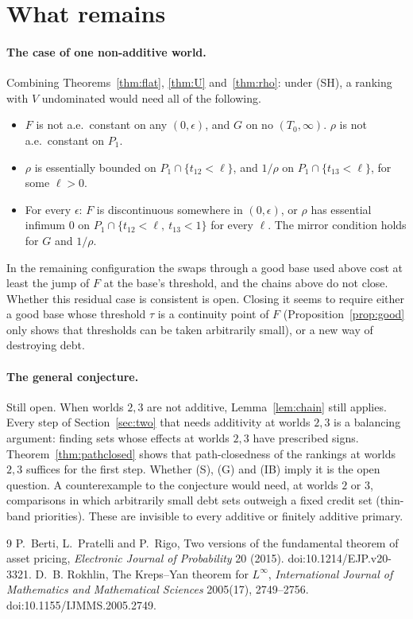 \documentclass[11pt]{article}
\theoremstyle{definition}\newtheorem{definition}[theorem]{Definition}
\theoremstyle{remark}\newtheorem{remark}[theorem]{Remark}
\begin{document}
\section{What remains}\label{sec:open}

\paragraph{The case of one non-additive world.} Combining
Theorems~\ref{thm:flat}, \ref{thm:U} and~\ref{thm:rho}: under (SH), a ranking
with $V$ undominated would need all of the following.
\begin{itemize}[leftmargin=*,itemsep=1pt]
\item $F$ is not a.e.\ constant on any $(0,\epsilon)$, and $G$ on no
$(T_0,\infty)$. $\rho$ is not a.e.\ constant on $P_1$.
\item $\rho$ is essentially bounded on $P_1\cap\{t_{12}<\ell\}$, and $1/\rho$
on $P_1\cap\{t_{13}<\ell\}$, for some $\ell>0$.
\item For every $\epsilon$: $F$ is discontinuous somewhere in $(0,\epsilon)$,
or $\rho$ has essential infimum $0$ on $P_1\cap\{t_{12}<\ell,\ t_{13}<1\}$ for
every $\ell$. The mirror condition holds for $G$ and $1/\rho$.
\end{itemize}
In the remaining configuration the swaps through a good base used above cost
at least the jump of $F$ at the base's threshold, and the chains above do not
close. Whether this residual case is consistent is open. Closing it seems to
require either a good base whose threshold $\tau$ is a continuity point of $F$
(Proposition~\ref{prop:good} only shows that thresholds can be taken
arbitrarily small), or a new way of destroying debt.

\paragraph{The general conjecture.} Still open. When worlds $2,3$ are not
additive, Lemma~\ref{lem:chain} still applies. Every step of
Section~\ref{sec:two} that needs additivity at worlds $2,3$ is a balancing
argument: finding sets whose effects at worlds $2,3$ have prescribed signs.
Theorem~\ref{thm:pathclosed} shows that path-closedness of the rankings at
worlds $2,3$ suffices for the first step. Whether (S), (G) and (IB) imply it
is the open question. A counterexample to the conjecture would need, at
worlds $2$ or $3$, comparisons in which arbitrarily small debt sets outweigh a
fixed credit set (thin-band priorities). These are invisible to every
additive or finitely additive primary.

\begin{thebibliography}{9}
 P.~Berti, L.~Pratelli and P.~Rigo, Two versions of the
fundamental theorem of asset pricing, \emph{Electronic Journal of
Probability} 20 (2015). doi:10.1214/EJP.v20-3321.
 D.~B. Rokhlin, The Kreps--Yan theorem for $L^\infty$,
\emph{International Journal of Mathematics and Mathematical Sciences}
2005(17), 2749--2756. doi:10.1155/IJMMS.2005.2749.
\end{thebibliography}
\end{document}
